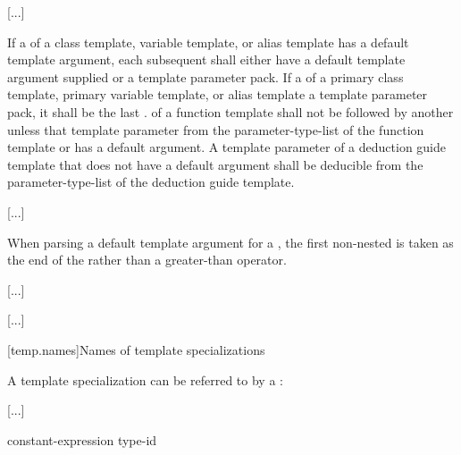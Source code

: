\documentclass{wg21}
\begin{document}
\textcolor{noteclr}{[...]}

\pnum
If a 
of a class template, variable template, or alias template has
a default template argument,
each subsequent 
shall either have a default template argument supplied or
 a template parameter pack.
If a  of
a primary class template, primary variable template, or alias template
 a template parameter pack,
it shall be the last .
 of a function template
shall not be followed by another 
unless that template parameter  from the
parameter-type-list of the function template or
has a default argument.
A template parameter of a deduction guide template
that does not have a default argument shall be deducible
from the parameter-type-list of the deduction guide template.
\begin{example} \textcolor{noteclr}{[...]} \end{example}

%
\pnum
When parsing a default template argument
for a ,
the first non-nested \tcode{>} is taken as
the end of the 
rather than a greater-than operator.
\begin{example} \textcolor{noteclr}{[...]} \end{example}




\textcolor{noteclr}{[...]}

[temp.names]{Names of template specializations}

\pnum
A template specialization  can be referred to by a
:

\begin{bnf}
    \textcolor{noteclr}{[...]}
\end{bnf}

\begin{bnf}
    \br
    constant-expression\br
    type-id\br
    \br
\end{bnf}
\end{document}
